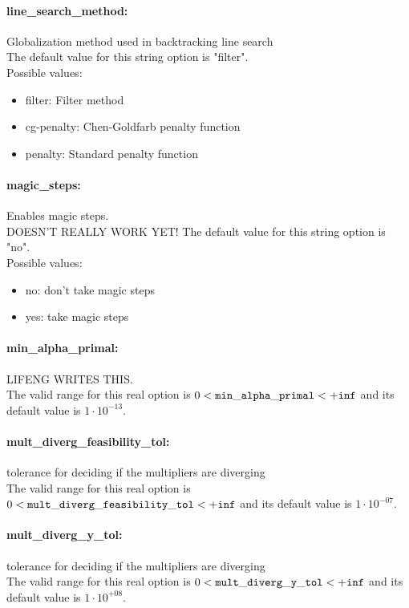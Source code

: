 \paragraph{line\_search\_method:}\label{sec:line_search_method} Globalization method used in backtracking line search $\;$ \\

The default value for this string option is "filter".
\\ 
Possible values:
\begin{itemize}
   \item filter: Filter method
   \item cg-penalty: Chen-Goldfarb penalty function
   \item penalty: Standard penalty function
\end{itemize}

\paragraph{magic\_steps:}\label{sec:magic_steps} Enables magic steps. $\;$ \\
 DOESN'T REALLY WORK YET!
The default value for this string option is "no".
\\ 
Possible values:
\begin{itemize}
   \item no: don't take magic steps
   \item yes: take magic steps
\end{itemize}

\paragraph{min\_alpha\_primal:}\label{sec:min_alpha_primal} LIFENG WRITES THIS. $\;$ \\
 The valid range for this real option is 
$0 <  {\tt min\_alpha\_primal } <  {\tt +inf}$
and its default value is $1 \cdot 10^{-13}$.


\paragraph{mult\_diverg\_feasibility\_tol:}\label{sec:mult_diverg_feasibility_tol} tolerance for deciding if the multipliers are diverging $\;$ \\
 The valid range for this real option is 
$0 <  {\tt mult\_diverg\_feasibility\_tol } <  {\tt +inf}$
and its default value is $1 \cdot 10^{-07}$.


\paragraph{mult\_diverg\_y\_tol:}\label{sec:mult_diverg_y_tol} tolerance for deciding if the multipliers are diverging $\;$ \\
 The valid range for this real option is 
$0 <  {\tt mult\_diverg\_y\_tol } <  {\tt +inf}$
and its default value is $1 \cdot 10^{+08}$.


